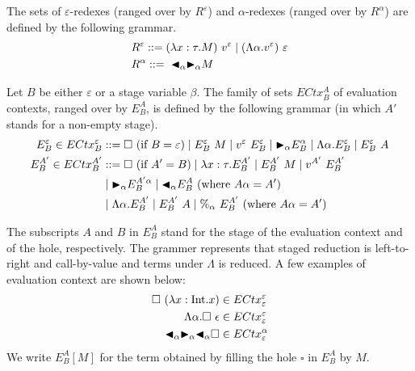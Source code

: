 \begin{definition}[Redex]
  The sets of $\varepsilon$-redexes (ranged over by $R^\varepsilon$) and $\alpha$-redexes (ranged over by $R^\alpha$) are defined by the following grammar.
  \begin{align*}
     & R^\varepsilon ::= (\lambda x:\tau.M)\ v^\varepsilon \mid (\Lambda\alpha.v^\varepsilon)\ \varepsilon \\
     & R^\alpha      ::=\ {\mathop{\blacktriangleleft}}_\alpha {\mathop{\blacktriangleright}}_\alpha M                                                         \\
  \end{align*}
\end{definition}

\begin{definition}
  Let $B$ be either \(\varepsilon\) or a stage variable \(\beta\).
  The family of sets $ECtx^A_B$ of evaluation contexts, ranged over by $E^A_B$, is defined by the following grammar (in which $A'$ stands for a non-empty stage).
  \begin{align*}
    E^\varepsilon_B \in ECtx^\varepsilon_B & ::= \square\ (\text{if\ } B = \varepsilon)
    \mid E^\varepsilon_B\ M \mid v^\varepsilon\ E^\varepsilon_B \mid {\mathop{\blacktriangleright}}_\alpha E^\alpha_B
    \mid \Lambda\alpha.E^\varepsilon_B \mid E^\varepsilon_B\ A                                                                                    \\
    E^{A'}_B \in ECtx^{A'}_B               & ::= \square\ (\text{if } A' = B) \mid \lambda x:\tau.E^{A'}_B \mid E^{A'}_B\ M \mid v^{A'}\ E^{A'}_B \\
                                           & \mid {\mathop{\blacktriangleright}}_\alpha E^{A'\alpha}_B \mid {\mathop{\blacktriangleleft}}_\alpha E^{A}_B \ (\text{where } A\alpha = A')               \\
                                           & \mid \Lambda\alpha.E^{A'}_B \mid E^{A'}_B\ A \mid \%_\alpha\ E^{A'}_B \ (\text{where } A\alpha = A')
  \end{align*}
\end{definition}

The subscripts $A$ and $B$ in $E^A_B$ stand for the stage of the evaluation context and of the hole, respectively.  The grammer represents that staged reduction is left-to-right and call-by-value and terms under \(\Lambda\) is reduced.
A few examples of evaluation context are shown below:
\begin{align*}
  \square\ (\lambda x:\textrm{Int}.x)                  & \in  ECtx^\varepsilon_\varepsilon \\
  \Lambda\alpha.\square\ \epsilon            & \in ECtx^\varepsilon_\varepsilon  \\
  {\mathop{\blacktriangleleft}}_\alpha {\mathop{\blacktriangleright}}_\alpha {\mathop{\blacktriangleleft}}_\alpha \square & \in ECtx^\alpha_\varepsilon
\end{align*}
%
We write $E^A_B[M]$ for the term obtained by filling the hole $\square$ in $E^A_B$ by $M$.

